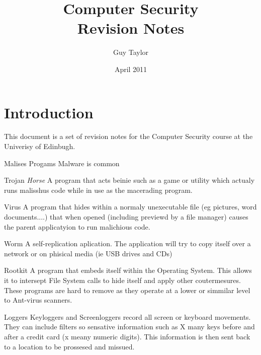\documentclass[11pt,twoside,a4paper]{article}
\begin{document}
  
  \title{Computer Security \\Revision Notes}
  \author{Guy Taylor}
  \date{April 2011}
  
  \maketitle
  
  \tableofcontents
  
  \section{Introduction}
    This document is a set of revision notes for the Computer Security \cite{cs_home} course at the Univerisy of Edinbugh.
  
  \clearpage
  \begin{section}{Malises Progams}
    Malware is common
      
      \begin{subsection}{Trojan \emph{Horse}}
        A program that acts beinie such as a game or utility which actualy runs malisshus code while in use as the macerading program.
      \end{subsection}
      
      \begin{subsection}{Virus}
        A program that hides within a normaly unexecutable file (eg pictures, word documents....) that when opened (including previewd by a file manager) causes the parent applicatyion to run malichious code.
      \end{subsection}
      
      \begin{subsection}{Worm}
        A self-replication aplication. The application will try to copy itself over a network or on phisical media (ie USB drives and CDs)
      \end{subsection}
      
      \begin{subsection}{Rootkit}
        A program that embeds itself within the Operating System. This allows it to intersept File System calls to hide itself and apply other coutermesures. These programs are hard to remove as they operate at a lower or simmilar level to Ant-virus scanners.
      \end{subsection}
      
      \begin{subsection}{Loggers}
        Keyloggers and Screenloggers record all screen or keyboard movements. They can include filters so sensative information such as X many keys before and after a credit card (x meany numeric digits). This information is then sent back to a location to be prossesed and missued.
      \end{subsection}
      

\end{section}
\end{document}
